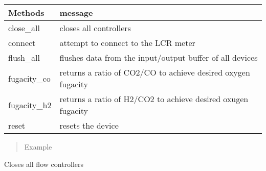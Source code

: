 \documentclass[letterpaper,10pt,english]{sphinxmanual}
\begin{document}
\begin{fulllineitems}
\begin{savenotes}\sphinxattablestart
\centering
\begin{tabulary}{\linewidth}[t]{|T|T|}
\hline
\sphinxstyletheadfamily 
Methods
&\sphinxstyletheadfamily 
message
\\
\hline
close\_all
&
closes all controllers
\\
\hline
connect
&
attempt to connect to the LCR meter
\\
\hline
flush\_all
&
flushes data from the input/output buffer of all devices
\\
\hline
fugacity\_co
&
returns a ratio of CO2/CO to achieve desired oxygen fugacity
\\
\hline
fugacity\_h2
&
returns a ratio of H2/CO2 to achieve desired oxugen fugacity
\\
\hline
reset
&
resets the device
\\
\hline
\end{tabulary}
\par
\sphinxattableend\end{savenotes}
\begin{quote}\begin{description}
\item[{Example}] \leavevmode
\end{description}\end{quote}

%
\begin{sphinxVerbatim}[commandchars=\\\{\}]
 
  
\end{sphinxVerbatim}

\begin{fulllineitems}
\label{\detokenize{source/laboratory.drivers:laboratory.drivers.mfc.MFC.close_all}}
Closes all flow controllers

\end{fulllineitems}



\end{fulllineitems}
\end{document}
